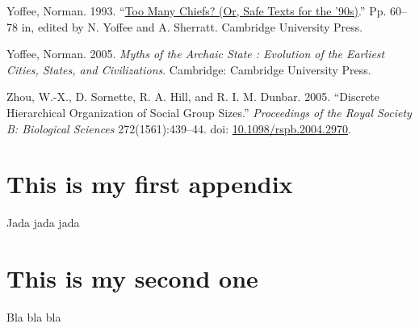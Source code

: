\documentclass[
  12pt,
]{book}
\newlength{\cslhangindent}
\newlength{\cslentryspacingunit} %
\newenvironment{CSLReferences}[2] %
 {%
  \setlength{\parindent}{0pt}
  \ifodd #1
  \let\oldpar\par
  \def\par{\hangindent=\cslhangindent\oldpar}
  \fi
  \setlength{\parskip}{#2\cslentryspacingunit}
 }%
 {}
\begin{document}
\begin{CSLReferences}{1}{0}
\leavevmode{}%
Yoffee, Norman. 1993. {``\href{https://doi.org/10.1017/CBO9780511720277.007}{Too Many Chiefs? (Or, Safe Texts for the '90s)}.''} Pp. 60--78 in, edited by N. Yoffee and A. Sherratt. Cambridge University Press.

\leavevmode{}%
Yoffee, Norman. 2005. \emph{Myths of the Archaic State : Evolution of the Earliest Cities, States, and Civilizations}. Cambridge: Cambridge University Press.

\leavevmode{}%
Zhou, W.-X., D. Sornette, R. A. Hill, and R. I. M. Dunbar. 2005. {``Discrete Hierarchical Organization of Social Group Sizes.''} \emph{Proceedings of the Royal Society B: Biological Sciences} 272(1561):439--44. doi: \href{https://doi.org/10.1098/rspb.2004.2970}{10.1098/rspb.2004.2970}.

\end{CSLReferences}

\hypertarget{appendix-appendix}{%
\appendix {}}


\hypertarget{this-is-my-first-appendix}{%
\chapter{This is my first appendix}\label{this-is-my-first-appendix}}

Jada jada jada

\hypertarget{this-is-my-second-one}{%
\chapter{This is my second one}\label{this-is-my-second-one}}

Bla bla bla
\end{document}
